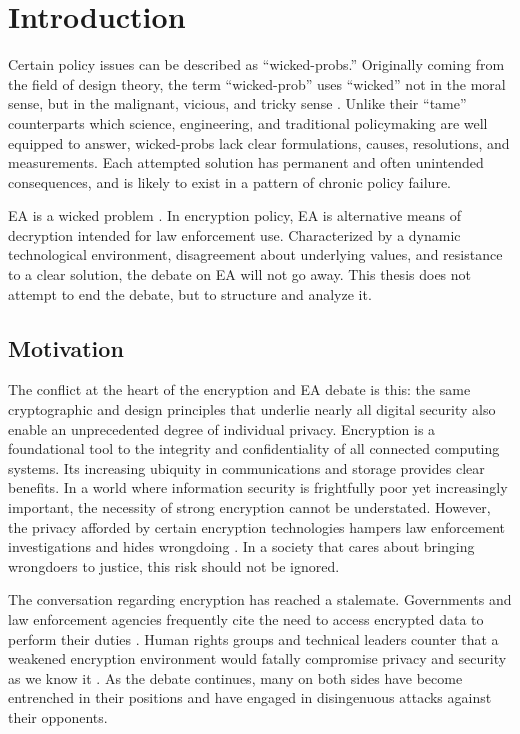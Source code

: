 \chapter{Introduction}
\label{chap-introduction}

Certain policy issues can be described as ``\acp{wicked-prob}.'' Originally coming from the field of design theory, the
term ``\ac{wicked-prob}'' uses ``wicked'' not in the moral sense, but in the malignant, vicious, and tricky sense
\cite{rittel_dilemmas_1973}. Unlike their ``tame'' counterparts which science, engineering, and traditional policymaking
are well equipped to answer, \acp{wicked-prob} lack clear formulations, causes, resolutions, and measurements. Each
attempted solution has permanent and often unintended consequences, and is likely to exist in a pattern of chronic
policy failure.

\Acl{EA} is a wicked problem \cite{rozenshtein_wicked_2018}. In encryption policy, \ac{EA} is alternative means of
decryption intended for law enforcement use. Characterized by a dynamic technological environment, disagreement about
underlying values, and resistance to a clear solution, the debate on \ac{EA} will not go away. This thesis does not
attempt to end the debate, but to structure and analyze it.


\section{Motivation}
\label{sec-motivation}

The conflict at the heart of the encryption and \ac{EA} debate is this: the same cryptographic and design principles
that underlie nearly all digital security also enable an unprecedented degree of individual privacy. Encryption is a
foundational tool to the integrity and confidentiality of all connected computing systems. Its increasing ubiquity in
communications and storage provides clear benefits. In a world where information security is frightfully poor yet
increasingly important, the necessity of strong encryption cannot be understated. However, the privacy afforded by
certain encryption technologies hampers law enforcement investigations and hides wrongdoing \cite{cox_2020}
\cite{keller_internet_2019}. In a society that cares about bringing wrongdoers to justice, this risk should not be
ignored.

The conversation regarding encryption has reached a stalemate. Governments and law enforcement agencies frequently cite
the need to access encrypted data to perform their duties \cite{ministerial_2018} \cite{intl_2020} \cite{comey_2014}.
Human rights groups and technical leaders counter that a weakened encryption environment would fatally compromise
privacy and security as we know it \cite{abelson_2015} \cite{eightythree_2017} \cite{ruiz_there_2018}. As the debate
continues, many on both sides have become entrenched in their positions and have engaged in disingenuous attacks against
their opponents.

